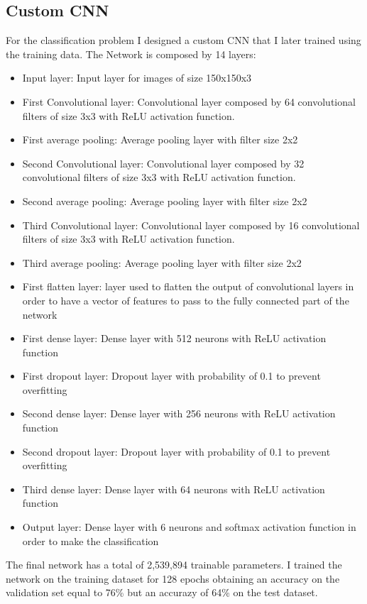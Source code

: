 \documentclass[12pt,journal,compsoc]{IEEEtran}
\begin{document}
\subsection{Custom CNN}
For the classification problem I designed a custom CNN that I later trained using the training data. The Network is composed by 14 layers:
\begin{itemize}
	\item Input layer: Input layer for images of size 150x150x3
	\item First Convolutional layer: Convolutional layer composed by 64 convolutional filters of size 3x3 with ReLU activation function.
	\item First average pooling: Average pooling layer with filter size 2x2
	\item Second Convolutional layer: Convolutional layer composed by 32 convolutional filters of size 3x3 with ReLU activation function.
	\item Second average pooling: Average pooling layer with filter size 2x2
	\item Third Convolutional layer: Convolutional layer composed by 16 convolutional filters of size 3x3 with ReLU activation function.
	\item Third average pooling: Average pooling layer with filter size 2x2
	\item First flatten layer: layer used to flatten the output of convolutional layers in order to have a vector of features to pass to the fully connected part of the network
	\item First dense layer: Dense layer with 512 neurons with ReLU activation function
	\item First dropout layer: Dropout layer with probability of 0.1 to prevent overfitting
	\item Second dense layer: Dense layer with 256 neurons with ReLU activation function
	\item Second dropout layer: Dropout layer with probability of 0.1 to prevent overfitting
	\item Third dense layer: Dense layer with 64 neurons with ReLU activation function
	\item Output layer: Dense layer with 6 neurons and softmax activation function in order to make the classification
\end{itemize}
The final network has a total of 2,539,894 trainable parameters.
I trained the network on the training dataset for 128 epochs obtaining an accuracy on the validation set equal to 76\% but an accurazy of 64\% on the test dataset.
\end{document}
